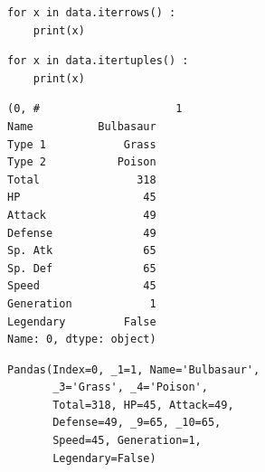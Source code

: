 \begin{frame}[fragile]
%
\begin{tcbraster}[raster columns=2,
                  raster equal height,
                  nobeforeafter,
                  raster column skip=0.5cm]
\begin{codebox}
\begin{verbatim}
for x in data.iterrows() :
    print(x)
\end{verbatim}
\end{codebox}
%
\begin{codebox}
\begin{verbatim}
for x in data.itertuples() :
    print(x)
\end{verbatim}
\end{codebox}
\end{tcbraster}
%
\begin{tcbraster}[raster columns=2,
                  raster equal height,
                  nobeforeafter,
                  raster column skip=0.5cm]
\begin{cmdbox}
\begin{verbatim}
(0, #                     1
Name          Bulbasaur
Type 1            Grass
Type 2           Poison
Total               318
HP                   45
Attack               49
Defense              49
Sp. Atk              65
Sp. Def              65
Speed                45
Generation            1
Legendary         False
Name: 0, dtype: object)
\end{verbatim}
\end{cmdbox}
%
\begin{cmdbox}
\begin{verbatim}
Pandas(Index=0, _1=1, Name='Bulbasaur',
       _3='Grass', _4='Poison',
       Total=318, HP=45, Attack=49,
       Defense=49, _9=65, _10=65,
       Speed=45, Generation=1,
       Legendary=False)
\end{verbatim}
\end{cmdbox}
\end{tcbraster}
%
\end{frame}


